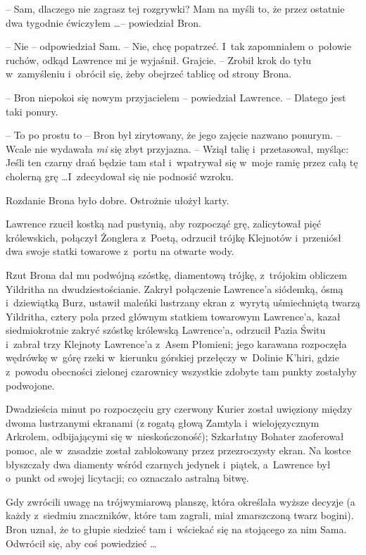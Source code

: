 \documentclass[oneside,polish,11pt,rmheadings]{mwbk}
\begin{document}
-- Sam, dlaczego nie zagrasz tej rozgrywki? Mam na myśli to, że przez ostatnie dwa tygodnie ćwiczyłem \ldots  -- powiedział Bron. 

-- Nie -- odpowiedział Sam.  -- Nie, chcę popatrzeć. I~tak zapomniałem o~połowie ruchów, odkąd Lawrence mi je wyjaśnił. Grajcie. -- Zrobił krok do tyłu w~zamyśleniu i~obrócił się, żeby obejrzeć tablicę od strony Brona. 

-- Bron niepokoi się nowym przyjacielem -- powiedział Lawrence. -- Dlatego jest taki ponury. 

-- To po prostu to -- Bron był zirytowany, że jego zajęcie nazwano ponurym. -- Wcale nie wydawała \textit{mi }się zbyt przyjazna. -- Wziął talię i~przetasował, myśląc: Jeśli ten czarny drań będzie tam stał i~wpatrywał się w~moje ramię przez całą tę cholerną grę \ldots  I~zdecydował się nie podnosić wzroku. 

Rozdanie Brona było dobre. Ostrożnie ułożył karty. 

Lawrence rzucił kostką nad pustynią, aby rozpocząć grę, zalicytował pięć królewskich, połączył Żonglera z~Poetą, odrzucił trójkę Klejnotów i~przeniósł dwa swoje statki towarowe z~portu na otwarte wody. 

Rzut Brona dał mu podwójną szóstkę, diamentową trójkę, z~trójokim obliczem Yildritha na dwudziestościanie. Zakrył połączenie Lawrence'a siódemką, ósmą i~dziewiątką Burz, ustawił maleńki lustrzany ekran z~wyrytą uśmiechniętą twarzą Yildritha, cztery pola przed głównym statkiem towarowym Lawrence'a, kazał siedmiokrotnie zakryć szóstkę królewską Lawrence'a, odrzucił Pazia Świtu i~zabrał trzy Klejnoty Lawrence'a z~Asem Płomieni; jego karawana rozpoczęła wędrówkę w~górę rzeki w~kierunku górskiej przełęczy w~Dolinie K'hiri, gdzie z~powodu obecności zielonej czarownicy wszystkie zdobyte tam punkty zostałyby podwojone. 

Dwadzieścia minut po rozpoczęciu gry czerwony Kurier został uwięziony między dwoma lustrzanymi ekranami (z rogatą głową Zamtyla i~wielojęzycznym Arkrolem, odbijającymi się w~nieskończoność); Szkarłatny Bohater zaoferował pomoc, ale w~zasadzie został zablokowany przez przezroczysty ekran. Na kostce błyszczały dwa diamenty wśród czarnych jedynek i~piątek, a~Lawrence był o~punkt od swojej licytacji; co oznaczało astralną bitwę. 

Gdy zwrócili uwagę na trójwymiarową planszę, która określała wyższe decyzje (a każdy z~siedmiu znaczników, które tam zagrali, miał zmarszczoną twarz bogini). Bron uznał, że to głupie siedzieć tam i~wściekać się na stojącego za nim Sama. Odwrócił się, aby coś powiedzieć \ldots  
\end{document}
